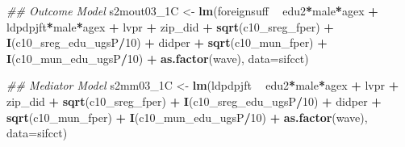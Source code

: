 \documentclass[
]{article}
\newenvironment{Shaded}{\begin{snugshade}}{\end{snugshade}}
\newcommand{\CommentTok}[1]{\textcolor[rgb]{0.56,0.35,0.01}{\textit{#1}}}
\newcommand{\DataTypeTok}[1]{\textcolor[rgb]{0.13,0.29,0.53}{#1}}
\newcommand{\DecValTok}[1]{\textcolor[rgb]{0.00,0.00,0.81}{#1}}
\newcommand{\KeywordTok}[1]{\textcolor[rgb]{0.13,0.29,0.53}{\textbf{#1}}}
\newcommand{\NormalTok}[1]{#1}
\newcommand{\OperatorTok}[1]{\textcolor[rgb]{0.81,0.36,0.00}{\textbf{#1}}}
\newcommand{\StringTok}[1]{\textcolor[rgb]{0.31,0.60,0.02}{#1}}
\begin{document}
\begin{Shaded}
\begin{Highlighting}[]
\CommentTok{## Outcome Model }
\NormalTok{s2mout03_1C <-}\StringTok{ }\KeywordTok{lm}\NormalTok{(foreignsuff  }\OperatorTok{~}\StringTok{ }\NormalTok{edu2}\OperatorTok{*}\NormalTok{male}\OperatorTok{*}\NormalTok{agex }\OperatorTok{+}\StringTok{ }\NormalTok{ldpdpjft}\OperatorTok{*}\NormalTok{male}\OperatorTok{*}\NormalTok{agex }\OperatorTok{+}\StringTok{ }\NormalTok{lvpr }\OperatorTok{+}\StringTok{  }
\StringTok{                    }\NormalTok{zip_did }\OperatorTok{+}\StringTok{ }\KeywordTok{sqrt}\NormalTok{(c10_sreg_fper) }\OperatorTok{+}\StringTok{ }\KeywordTok{I}\NormalTok{(c10_sreg_edu_ugsP}\OperatorTok{/}\DecValTok{10}\NormalTok{) }\OperatorTok{+}\StringTok{ }
\StringTok{                    }\NormalTok{didper }\OperatorTok{+}\StringTok{ }\KeywordTok{sqrt}\NormalTok{(c10_mun_fper) }\OperatorTok{+}\StringTok{ }\KeywordTok{I}\NormalTok{(c10_mun_edu_ugsP}\OperatorTok{/}\DecValTok{10}\NormalTok{) }\OperatorTok{+}\StringTok{ }
\StringTok{                    }\KeywordTok{as.factor}\NormalTok{(wave), }\DataTypeTok{data=}\NormalTok{sifcct)}

\CommentTok{## Mediator Model}
\NormalTok{s2mm03_1C <-}\StringTok{ }\KeywordTok{lm}\NormalTok{(ldpdpjft }\OperatorTok{~}\StringTok{ }\NormalTok{edu2}\OperatorTok{*}\NormalTok{male}\OperatorTok{*}\NormalTok{agex }\OperatorTok{+}\StringTok{ }\NormalTok{lvpr }\OperatorTok{+}\StringTok{  }
\StringTok{                  }\NormalTok{zip_did }\OperatorTok{+}\StringTok{ }\KeywordTok{sqrt}\NormalTok{(c10_sreg_fper) }\OperatorTok{+}\StringTok{ }\KeywordTok{I}\NormalTok{(c10_sreg_edu_ugsP}\OperatorTok{/}\DecValTok{10}\NormalTok{) }\OperatorTok{+}\StringTok{ }
\StringTok{                  }\NormalTok{didper }\OperatorTok{+}\StringTok{ }\KeywordTok{sqrt}\NormalTok{(c10_mun_fper) }\OperatorTok{+}\StringTok{ }\KeywordTok{I}\NormalTok{(c10_mun_edu_ugsP}\OperatorTok{/}\DecValTok{10}\NormalTok{) }\OperatorTok{+}\StringTok{ }
\StringTok{                  }\KeywordTok{as.factor}\NormalTok{(wave), }\DataTypeTok{data=}\NormalTok{sifcct)}


\end{Highlighting}
\end{Shaded}
\end{document}
